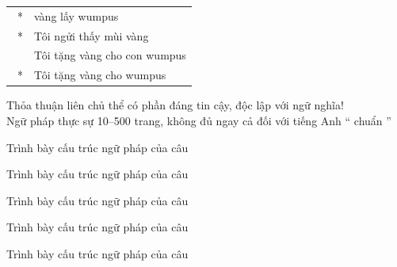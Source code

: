 \documentclass{article}
\begin{document}
\begin{huge}
\begin{tabular}{ll}
  \ * & vàng lấy wumpus \\
  \ * & Tôi ngửi thấy mùi vàng \\
    & Tôi tặng vàng cho con wumpus \\
  \ * & Tôi tặng vàng cho wumpus
\end{tabular}

Thỏa thuận liên chủ thể có phần đáng tin cậy, độc lập với ngữ nghĩa!\\
Ngữ pháp thực sự 10--500 trang, không đủ ngay cả đối với tiếng Anh `` chuẩn ''




Trình bày cấu trúc ngữ pháp của câu

\vspace*{0.2in}

\textwidth
{}


Trình bày cấu trúc ngữ pháp của câu

\vspace*{0.2in}

\textwidth
{}


Trình bày cấu trúc ngữ pháp của câu

\vspace*{0.2in}

\textwidth
{}


Trình bày cấu trúc ngữ pháp của câu

\vspace*{0.2in}

\textwidth
{}


Trình bày cấu trúc ngữ pháp của câu

\vspace*{0.2in}


\end{huge}
\end{document}
